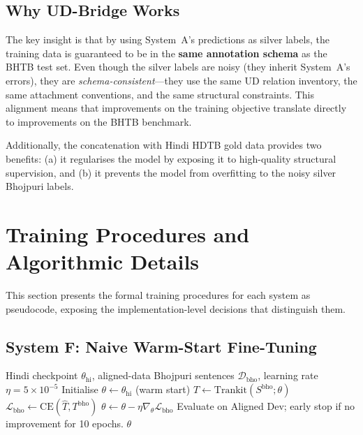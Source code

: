 \documentclass[12pt,a4paper,oneside]{report}
\begin{document}
\subsection{Why UD-Bridge Works}

The key insight is that by using System~A's predictions as silver labels, the training
data is guaranteed to be in the \textbf{same annotation schema} as the BHTB test set.
Even though the silver labels are noisy (they inherit System~A's errors), they are
\emph{schema-consistent}---they use the same UD relation inventory, the same
attachment conventions, and the same structural constraints. This alignment means
that improvements on the training objective translate directly to improvements on the
BHTB benchmark.

Additionally, the concatenation with Hindi HDTB gold data provides two benefits:
(a) it regularises the model by exposing it to high-quality structural supervision,
and (b) it prevents the model from overfitting to the noisy silver Bhojpuri labels.

\section{Training Procedures and Algorithmic Details}
\label{sec:train_procedures}

This section presents the formal training procedures for each system as
pseudocode, exposing the implementation-level decisions that distinguish them.

\subsection{System F: Naive Warm-Start Fine-Tuning}

\begin{algorithm}[ht]
\caption{System F training (warm-start fine-tuning).}
\label{alg:system_f}
\begin{algorithmic}[1]
\Require Hindi checkpoint $\theta_{\text{hi}}$, aligned-data Bhojpuri sentences
         $\mathcal{D}_{\text{bho}}$, learning rate $\eta = 5\times 10^{-5}$
\State Initialise $\theta \gets \theta_{\text{hi}}$ (warm start)
    \State $\hat{T} \gets \text{Trankit}(S^{\text{bho}}; \theta)$
    \State $\mathcal{L}_{\text{bho}} \gets \text{CE}(\hat{T}, T^{\text{bho}})$
    \State $\theta \gets \theta - \eta \nabla_\theta \mathcal{L}_{\text{bho}}$
  \EndFor
  \State Evaluate on Aligned Dev; early stop if no improvement for 10 epochs.
\EndFor
\State \Return $\theta$
\end{algorithmic}
\end{algorithm}
\end{document}
